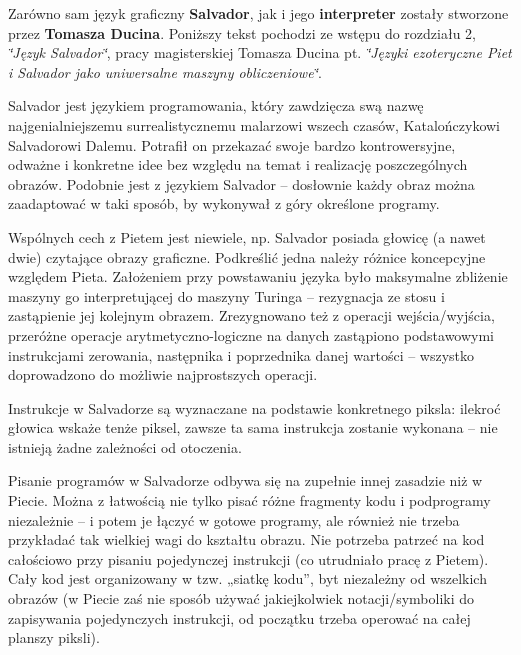 Zarówno sam język graficzny {\bf Salvador}, jak i jego {\bf interpreter} zostały stworzone przez {\bf Tomasza Ducina}. Poniższy tekst pochodzi ze wstępu do rozdziału 2, {\em \char`\"{}Język Salvador\char`\"{}\/}, pracy magisterskiej Tomasza Ducina pt. {\em \char`\"{}Języki ezoteryczne Piet i Salvador jako uniwersalne maszyny obliczeniowe\char`\"{}\/}.

Salvador jest językiem programowania, który zawdzięcza swą nazwę najgenialniejszemu surrealistycznemu malarzowi wszech czasów, Katalończykowi Salvadorowi Dalemu. Potrafił on przekazać swoje bardzo kontrowersyjne, odważne i konkretne idee bez względu na temat i realizację poszczególnych obrazów. Podobnie jest z językiem Salvador – dosłownie każdy obraz można zaadaptować w taki sposób, by wykonywał z góry określone programy.

Wspólnych cech z Pietem jest niewiele, np. Salvador posiada głowicę (a nawet dwie) czytające obrazy graficzne. Podkreślić jedna należy różnice koncepcyjne względem Pieta. Założeniem przy powstawaniu języka było maksymalne zbliżenie maszyny go interpretującej do maszyny Turinga – rezygnacja ze stosu i zastąpienie jej kolejnym obrazem. Zrezygnowano też z operacji wejścia/wyjścia, przeróżne operacje arytmetyczno-logiczne na danych zastąpiono podstawowymi instrukcjami zerowania, następnika i poprzednika danej wartości – wszystko doprowadzono do możliwie najprostszych operacji.

Instrukcje w Salvadorze są wyznaczane na podstawie konkretnego piksla: ilekroć głowica wskaże tenże piksel, zawsze ta sama instrukcja zostanie wykonana – nie istnieją żadne zależności od otoczenia.

Pisanie programów w Salvadorze odbywa się na zupełnie innej zasadzie niż w Piecie. Można z łatwością nie tylko pisać różne fragmenty kodu i podprogramy niezależnie – i potem je łączyć w gotowe programy, ale również nie trzeba przykładać tak wielkiej wagi do kształtu obrazu. Nie potrzeba patrzeć na kod całościowo przy pisaniu pojedynczej instrukcji (co utrudniało pracę z Pietem). Cały kod jest organizowany w tzw. „siatkę kodu”, byt niezależny od wszelkich obrazów (w Piecie zaś nie sposób używać jakiejkolwiek notacji/symboliki do zapisywania pojedynczych instrukcji, od początku trzeba operować na całej planszy piksli). 